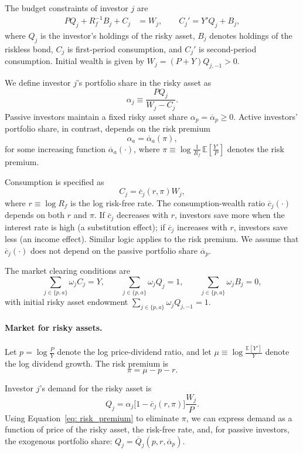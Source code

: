 \documentclass[12pt,english]{article}
\begin{document}
The budget constraints of investor $j$ are
\begin{align*}
    P Q_j + R_f^{-1} B_j + C_j &= W_j, 
    \qquad 
    C_j' = Y' Q_j + B_j,
\end{align*}
where $Q_j$ is the investor's holdings of the risky asset, $B_j$ denotes holdings of the riskless bond, $C_j$ is first-period consumption, and $C_j'$ is second-period consumption.
Initial wealth is given by
$ W_j = (P+Y) Q_{j,-1} > 0. $

We define investor $j$'s portfolio share in the risky asset as
\[
    \alpha_j \equiv \frac{P Q_j}{W_j - C_j}.
\] 
Passive investors maintain a fixed risky asset share $\alpha_p = \overline{\alpha}_p \geq 0$.
Active investors' portfolio share, in contrast, depends on the risk premium
\[
    \alpha_a = \overline{\alpha}_a(\pi),
\]
for some increasing function $\overline{\alpha}_a(\cdot)$, where $\pi \equiv \log \frac{1}{R_f}\,\mathbb{E}\!\left[\frac{Y'}{P}\right]$ denotes the risk premium.

Consumption is specified as
\[
    C_j = \overline{c}_{j}(r,\pi) W_j,
\]
where $r \equiv \log R_f$ is the log risk-free rate.
The consumption-wealth ratio $\overline{c}_j(\cdot)$ depends on both $r$ and $\pi$.
If $\overline{c}_j$ decreases with $r$, investors save more when the interest rate is high (a substitution effect); if $\overline{c}_j$ increases with $r$, investors save less (an income effect).
Similar logic applies to the risk premium.
We assume that $\overline{c}_j(\cdot)$ does not depend on the passive portfolio share $\overline{\alpha}_p$.

The market clearing conditions are
\[
    \sum_{j\in\{p,a\}} \omega_j C_j = Y, \qquad
    \sum_{j\in\{p,a\}} \omega_j Q_j = 1, \qquad
    \sum_{j\in\{p,a\}} \omega_j B_j = 0,
\]
with initial risky asset endowment $\sum_{j\in\{p,a\}} \omega_j Q_{j,-1} = 1$.

\paragraph{Market for risky assets.}
Let $p = \log \frac{P}{Y}$ denote the log price-dividend ratio, and let $\mu \equiv \log \frac{\mathbb{E}[Y']}{Y}$ denote the log dividend growth.
The risk premium is
\begin{equation}\label{eq: risk_premium}
    \pi = \mu - p - r.
\end{equation}

Investor $j$'s demand for the risky asset is
\[
    Q_j = \alpha_j \bigl[1 - \overline{c}_{j}(r,\pi)\bigr] \frac{W_j}{P}.
\]
Using Equation~\eqref{eq: risk_premium} to eliminate $\pi$, we can express demand as a function of price of the risky asset, the risk-free rate, and, for passive investors, the exogenous portfolio share:
$
    Q_j = \overline{Q}_j(p, r, \overline{\alpha}_p).
$
\end{document}
